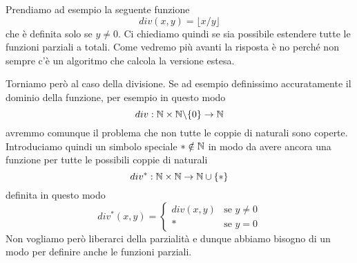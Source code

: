 Prendiamo ad esempio la seguente funzione
\[ div(x,y) = \lfloor x / y \rfloor \]
che è definita solo se $y \neq 0$. Ci chiediamo quindi se sia
possibile estendere tutte le funzioni parziali a totali. Come
vedremo più avanti la risposta è no perché non sempre c'è un
algoritmo che calcola la versione estesa.

Torniamo però al caso della divisione. Se ad esempio definissimo
accuratamente il dominio della funzione, per esempio in questo
modo
\[ div : \mathbb{N} \times \mathbb{N} \backslash \{ 0 \} \to \mathbb{N} \]
avremmo comunque il problema che non tutte le coppie di naturali
sono coperte. Introduciamo quindi un simbolo speciale
$* \notin \mathbb{N}$ in modo da avere ancora una funzione per tutte le
possibili coppie di naturali
\[ div^* : \mathbb{N} \times \mathbb{N} \to \mathbb{N} \cup \{ * \} \]
definita in questo modo
\[
	div^* (x, y) = \begin{cases}
		div(x, y) & \text{se } y \neq 0 \\
		*         & \text{se } y = 0
	\end{cases}
\]
Non vogliamo però liberarci della parzialità e dunque abbiamo
bisogno di un modo per definire anche le funzioni parziali.

